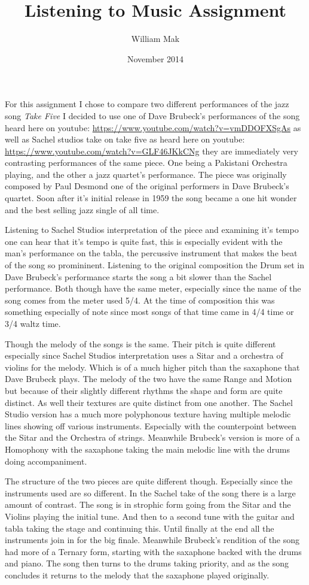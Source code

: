 \documentclass{article}
\title{Listening to Music Assignment}
\author{William Mak}
\date{November 2014}
\begin{document}
\maketitle

For this assignment I chose to compare two different performances of the jazz 
song {\it Take Five} I decided to use one of Dave Brubeck's performances of the 
song heard here on youtube:
\url{https://www.youtube.com/watch?v=vmDDOFXSgAs}
as well as Sachel studios take on take five as heard here on youtube:
\url{https://www.youtube.com/watch?v=GLF46JKkCNg}
they are immediately very contrasting performances of the same piece. One being
a Pakistani Orchestra playing, and the other a jazz quartet's performance. The
piece was originally composed by Paul Desmond one of the original performers in
Dave Brubeck's quartet. Soon after it's initial release in 1959 the song became
a one hit wonder and the best selling jazz single of all time.

Listening to Sachel Studios interpretation of the piece and examining it's tempo
one can hear that it's tempo is quite fast, this is especially evident with the
man's performance on the tabla, the percussive instrument that makes the beat of
the song so promininent. Listening to the original composition the Drum set in
Dave Brubeck's performance starts the song a bit slower than the Sachel
performance. Both though have the same meter, especially since the name of the
song comes from the meter used 5/4. At the time of composition this was
something especially of note since most songs of that time came in 4/4 time or
3/4 waltz time.

Though the melody of the songs is the same. Their pitch is quite different
especially since Sachel Studios interpretation uses a Sitar and a orchestra of
violins for the melody. Which is of a much higher pitch than the saxaphone that
Dave Brubeck plays. The melody of the two have the same Range and Motion but
because of their slightly different rhythms the shape and form are quite
distinct. As well their textures are quite distinct from one another. The Sachel
Studio version has a much more polyphonous texture having multiple melodic lines
showing off various instruments. Especially with the counterpoint between the
Sitar and the Orchestra of strings. Meanwhile Brubeck's version is more of a
Homophony with the saxaphone taking the main melodic line with the drums doing
accompaniment.

The structure of the two pieces are quite different though. Especially since the
instruments used are so different. In the Sachel take of the song there is a
large amount of contrast. The song is in strophic form going from the Sitar and
the Violins playing the initial tune. And then to a second tune with the guitar
and tabla taking the stage and continuing this. Until finally at the end all the
instruments join in for the big finale. Meanwhile Brubeck's rendition of the
song had more of a Ternary form, starting with the saxaphone backed with the
drums and piano. The song then turns to the drums taking priority, and as the
song concludes it returns to the melody that the saxaphone played originally. 
\end{document}
